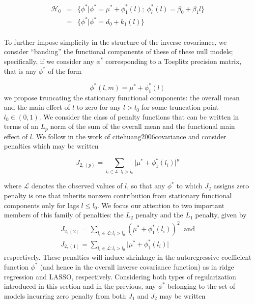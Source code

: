 \documentclass[12pt]{article}
\theoremstyle{definition}
\begin{document}
\begin{eqnarray*}
\mathcal{H}_0 &=& \lbrace \phi^* \vert \phi^* = \mu^* + \phi^*_1\left(l\right); \; \phi^*_l\left(l\right) = \beta_0 + \beta_1l \rbrace\\
&=& \lbrace \phi^* \vert \phi^* = d_0 + k_1\left(l\right) \rbrace\\
\end{eqnarray*}
\noindent

To further impose simplicity in the structure of the inverse covariance, we consider ``banding'' the functional components of these of these null models; specifically, if we consider any $\phi^*$ corresponding to a Toeplitz precision matrix, that is any $\phi^*$ of the form

\begin{equation}
\phi^*\left(l,m\right) = \mu^* + \phi^*_1\left(l\right)
\end{equation}
\noindent
we propose truncating the stationary functional components:  the overall mean and the main effect of $l$ to zero for any $l > l_0$ for some truncation point $l_0 \in \left(0,1\right)$. We consider the class of penalty functions that can be written in terms of an $L_p$ norm of the sum of the overall mean and the functional main effect of $l$. We follow in the work of cite{huang2006covariance} and consider penalties which may be written

\begin{equation}
J_{2,\left(p\right)} = \sum_{ l_i \in \mathcal{L}: l_i > l_0} \vert \mu^* + \phi^*_1\left(l_i\right) \vert^p  \label{bandedpenalty}
\end{equation}
\noindent

where $\mathcal{L}$ denotes the observed values of $l$, so that any $\phi^*$ to which $J_2$ assigns zero penalty is one that inherits nonzero contribution from stationary functional components only for lags $l \le l_0$. We focus our attention to two important members of this family of penalties: the $L_2$ penalty and the $L_1$ penalty, given by
\begin{eqnarray} \nonumber
 J_{2,\left(2\right)} = \sum_{ l_i \in \mathcal{L}: l_i > l_0} \left( \mu^* + \phi^*_1\left(l_i\right) \right)^2 \label{L2penalty} \;\;\mbox{and}\\
 J_{2,\left(1\right)} = \sum_{ l_i \in \mathcal{L}: l_i > l_0} \vert \mu^* + \phi^*_1\left(l_i\right) \vert \label{L1penalty}
 \end{eqnarray}\noindent
respectively. These penalties will induce shrinkage in the autoregressive coefficient function $\phi^*$ (and hence in the overall inverse covariance function) as in ridge regression and LASSO, respectively. Considering both types of regularization introduced in this section and in the previous, any $\phi^*$ belonging to the set of models incurring zero penalty from both $J_1$ and $J_2$ may be written
\end{document}
